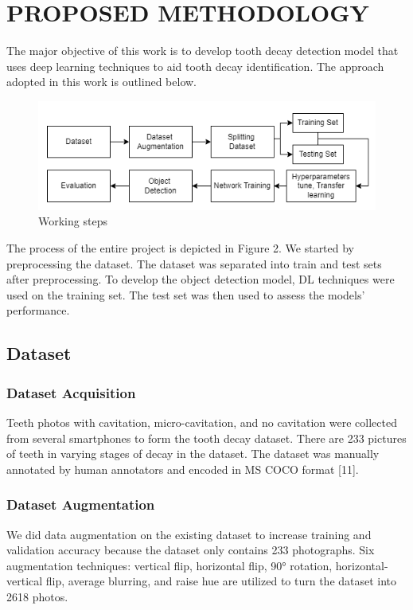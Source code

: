 \chapter{PROPOSED METHODOLOGY}
The major objective of this work is to develop tooth decay detection model that uses deep learning techniques to aid tooth decay identification. The approach adopted in this work is outlined below.\\
\vspace{5pt}
\begin{figure}[H]
    \centering
    \includegraphics[scale=1]{40_Chapter_4/2.png}
    \caption{Working steps}
    \label{Working steps}
\end{figure}
The process of the entire project is depicted in Figure 2. We started by preprocessing the dataset. The dataset was separated into train and test sets after preprocessing. To develop the object detection model, DL techniques were used on the training set. The test set was then used to assess the models' performance.\\
\section{Dataset}
\subsection{Dataset Acquisition} Teeth photos with cavitation, micro-cavitation, and no cavitation were collected from several smartphones to form the tooth decay dataset. There are 233 pictures of teeth in varying stages of decay in the dataset. The dataset was manually annotated by human annotators and encoded in MS COCO format [11].
\subsection{Dataset Augmentation} We did data augmentation on the existing dataset to increase training and validation accuracy because the dataset only contains 233 photographs. Six augmentation techniques: vertical flip, horizontal flip, 90° rotation, horizontal-vertical flip, average blurring, and raise hue are utilized to turn the dataset into 2618 photos. 
